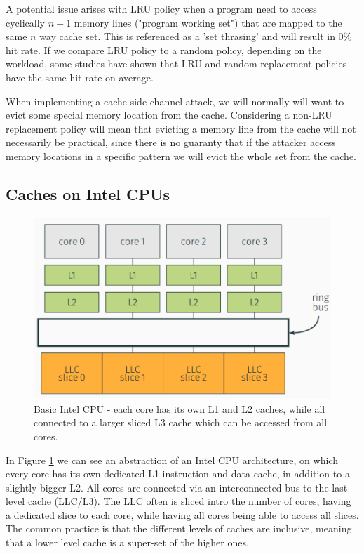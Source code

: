 A potential issue arises with LRU policy when a program need to access cyclically $n+1$ memory lines ("program working set") that are mapped to the same $n$ way cache set. This is referenced as a 'set thrasing' and will result in $0\%$ hit rate. If we compare LRU policy to a random policy, depending on the workload, some studies have shown that LRU and random replacement policies have the same hit rate on average.

When implementing a cache side-channel attack, we will normally will want to evict some special memory location from the cache. Considering a non-LRU replacement policy will mean that evicting a memory line from the cache will not necessarily be practical, since there is no guaranty that if the attacker access memory locations in a specific pattern we will evict the whole set from the cache. 
\subsection{Caches on Intel CPUs}

\begin{figure}
    \centering
    \includegraphics[width=\textwidth]{images/IntelCPU.PNG}
    \caption{Basic Intel CPU - each core has its own L1 and L2 caches, while all connected to a larger sliced L3 cache which can be accessed from all cores. }
    \label{fig:IntelCPU}
\end{figure}

In Figure \ref{fig:IntelCPU} we can see an abstraction of an Intel CPU architecture, on which every core has its own dedicated L1 instruction and data cache, in addition to a slightly bigger L2. All cores are connected via an interconnected bus to the last level cache (LLC/L3). The LLC often is sliced intro the number of cores, having a dedicated slice to each core, while having all cores being able to access all slices. The common practice is that the different levels of caches are inclusive, meaning that a lower level cache is a super-set of the higher ones.  


